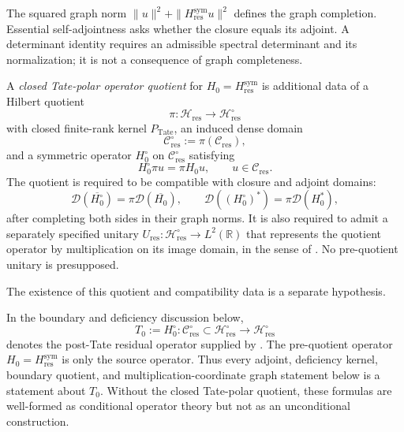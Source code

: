 \begin{remark}
\label{v4-arith:w9-r4:rem:single-estimate-left}
The squared graph norm \(\|u\|^2+\|H_{\mathrm{res}}^{\mathrm{sym}}u\|^2\)
defines the graph completion. Essential self-adjointness asks
whether the closure equals its adjoint. A determinant identity
requires an admissible spectral determinant and its normalization;
it is not a consequence of graph completeness.
\end{remark}

\begin{definition}
\label{v4-arith:w9-r4:def:tate-polar-operator-quotient}
\ClaimStatusConditional A \emph{closed Tate-polar operator quotient}
for \(H_{0}=H_{\mathrm{res}}^{\mathrm{sym}}\) is additional data of a
Hilbert quotient
\[
\pi\colon \mathcal{H}_{\mathrm{res}}\longrightarrow
\mathcal{H}_{\mathrm{res}}^{\circ}
\]
with closed finite-rank kernel \(P_{\mathrm{Tate}}\), an induced
dense domain
\[
\mathcal{C}_{\mathrm{res}}^{\circ}:=\pi(\mathcal{C}_{\mathrm{res}}),
\]
and a symmetric operator \(H_{0}^{\circ}\) on
\(\mathcal{C}_{\mathrm{res}}^{\circ}\) satisfying
\[
H_{0}^{\circ}\pi u=\pi H_{0}u,\qquad u\in\mathcal{C}_{\mathrm{res}}.
\]
The quotient is required to be compatible with closure and adjoint
domains:
\[
\mathcal{D}(\overline{H_{0}^{\circ}})
=\pi\mathcal{D}(\overline{H_{0}}),
\qquad
\mathcal{D}((H_{0}^{\circ})^{*})
=\pi\mathcal{D}(H_{0}^{*}),
\]
after completing both sides in their graph norms. It is also required
to admit a separately specified unitary
\(U_{\mathrm{res}}:\mathcal H_{\mathrm{res}}^\circ\to L^2(\mathbb R)\)
that represents the quotient operator by multiplication on its
image domain, in the sense of
.
No pre-quotient unitary is presupposed.

The existence of this quotient and compatibility data is a
separate hypothesis.
\end{definition}

\begin{remark}
\label{v4-arith:w9-r4:rem:post-tate-notation}
\ClaimStatusDefinitional In the boundary and deficiency discussion
below,
\[
T_{0}:=H_{0}^{\circ}\colon
\mathcal{C}_{\mathrm{res}}^{\circ}\subset
\mathcal{H}_{\mathrm{res}}^{\circ}\longrightarrow
\mathcal{H}_{\mathrm{res}}^{\circ}
\]
denotes the post-Tate residual operator supplied by
. The
pre-quotient operator \(H_{0}=H_{\mathrm{res}}^{\mathrm{sym}}\) is only
the source operator. Thus every adjoint, deficiency kernel, boundary
quotient, and multiplication-coordinate graph statement below is a statement
about \(T_{0}\). Without the closed Tate-polar quotient, these formulas
are well-formed as conditional operator theory but not as an
unconditional construction.
\end{remark}

